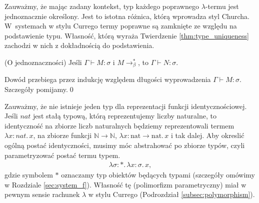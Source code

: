 Zauważmy, że mając zadany kontekst, typ każdego poprawnego \(\lambda\)-termu jest jednoznacznie określony. Jest to istotna różnica, którą wprowadza styl Churcha. W~systemach w stylu Currego termy poprawne są zamknięte ze względu na podstawienie typu. Własność, którą wyraża Twierdzenie \ref{thm:type_uniqueness} zachodzi w nich z dokładnością do podstawienia. 

\begin{twierdzenie}\label{thm:type_uniqueness}(O jednoznaczności)
  Jeśli \(\Gamma\vdash M:\sigma\) i \(M\to^{*}_\beta\), to \(\Gamma\vdash N:\sigma\).
\end{twierdzenie}
\begin{dowod}
  Dowód przebiega przez indukcję względem długości wyprowadzenia \(\Gamma\vdash M:\sigma\). Szczegóły pomijamy.\qed
\end{dowod}

\begin{przyklad}
Zauważmy, że nie istnieje jeden typ dla reprezentacji funkcji identycznościowej. Jeśli \(nat\) jest stałą typową, którą reprezentujemy liczby naturalne, to identyczność na zbiorze liczb naturalnych będziemy reprezentowali termem \(\lambda x:nat.\,x\), na zbiorze funkcji \(\mathbb{N}\to\mathbb{N}\), \(\lambda x:\mathrm{nat}\to\mathrm{nat}.\,x\) i tak dalej.
  Aby okreslić ogólną postać identyczności, musimy móc abstrahować po zbiorze typów, czyli parametryzować postać termu typem. %
      \begin{align*}
        \lambda \sigma:* .\,\lambda x:\sigma.\,x,
      \end{align*}
      gdzie symbolem \(*\) oznaczamy typ obiektów będących typami (szczegóły omówimy w Rozdziale \ref{sec:system_f}).
      Własność tę (polimorfizm parametryczny) miał w pewnym sensie rachunek \(\lambda\) w stylu Currego (Podrozdział \ref{subsec:polymorphism}). 
\end{przyklad}

